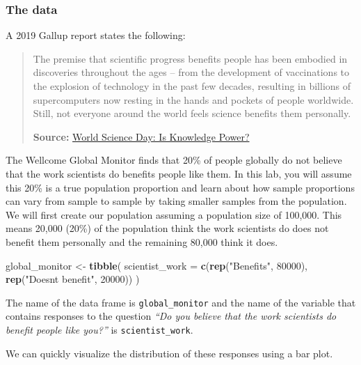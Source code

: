 \documentclass[
]{article}
\newenvironment{Shaded}{\begin{snugshade}}{\end{snugshade}}
\newcommand{\AttributeTok}[1]{\textcolor[rgb]{0.13,0.29,0.53}{#1}}
\newcommand{\DecValTok}[1]{\textcolor[rgb]{0.00,0.00,0.81}{#1}}
\newcommand{\FunctionTok}[1]{\textcolor[rgb]{0.13,0.29,0.53}{\textbf{#1}}}
\newcommand{\NormalTok}[1]{#1}
\newcommand{\OtherTok}[1]{\textcolor[rgb]{0.56,0.35,0.01}{#1}}
\newcommand{\StringTok}[1]{\textcolor[rgb]{0.31,0.60,0.02}{#1}}
\begin{document}
\subsubsection{The data}\label{the-data}

A 2019 Gallup report states the following:

\begin{quote}
The premise that scientific progress benefits people has been embodied
in discoveries throughout the ages -- from the development of
vaccinations to the explosion of technology in the past few decades,
resulting in billions of supercomputers now resting in the hands and
pockets of people worldwide. Still, not everyone around the world feels
science benefits them personally.

\textbf{Source:}
\href{https://news.gallup.com/opinion/gallup/268121/world-science-day-knowledge-power.aspx}{World
Science Day: Is Knowledge Power?}
\end{quote}

The Wellcome Global Monitor finds that 20\% of people globally do not
believe that the work scientists do benefits people like them. In this
lab, you will assume this 20\% is a true population proportion and learn
about how sample proportions can vary from sample to sample by taking
smaller samples from the population. We will first create our population
assuming a population size of 100,000. This means 20,000 (20\%) of the
population think the work scientists do does not benefit them personally
and the remaining 80,000 think it does.

\begin{Shaded}
\begin{Highlighting}[]
\NormalTok{global\_monitor }\OtherTok{\textless{}{-}} \FunctionTok{tibble}\NormalTok{(}
  \AttributeTok{scientist\_work =} \FunctionTok{c}\NormalTok{(}\FunctionTok{rep}\NormalTok{(}\StringTok{"Benefits"}\NormalTok{, }\DecValTok{80000}\NormalTok{), }\FunctionTok{rep}\NormalTok{(}\StringTok{"Doesn\textquotesingle{}t benefit"}\NormalTok{, }\DecValTok{20000}\NormalTok{))}
\NormalTok{)}
\end{Highlighting}
\end{Shaded}

The name of the data frame is \texttt{global\_monitor} and the name of
the variable that contains responses to the question \emph{``Do you
believe that the work scientists do benefit people like you?''} is
\texttt{scientist\_work}.

We can quickly visualize the distribution of these responses using a bar
plot.
\end{document}
